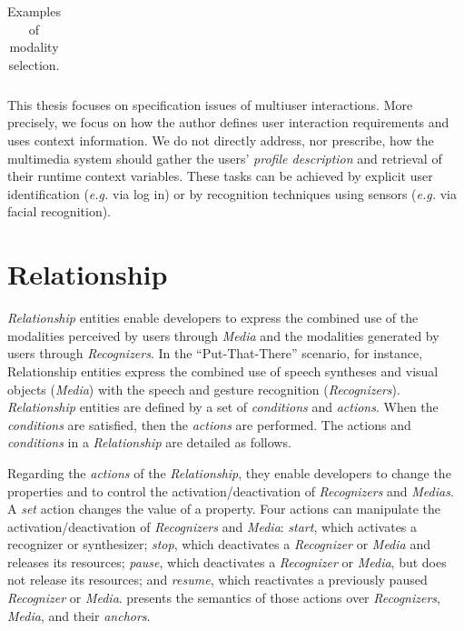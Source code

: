 \begin{table}
\begin{tabular}[!ht]{ c m{5.5cm} m{5.5cm}}
\end{tabular}
\caption{Examples of modality selection.}
\label{table:selection}
\end{table}

This thesis focuses on specification issues of multiuser interactions. More
precisely, we focus on how the author defines user interaction requirements and
uses context information. We do not directly address, nor prescribe, how the
multimedia system should gather the users’ \textit{profile description} and
retrieval of their runtime context variables. These tasks can be achieved by
explicit user identification (\textit{e.g.} via log in) or by recognition techniques using
sensors (\textit{e.g.} via facial recognition).

\section{Relationship}
\label{sec:approuach:relationship}

\textit{Relationship} entities enable developers to express the combined use of
the modalities perceived by users through \textit{Media} and the modalities
generated by users through \textit{Recognizers}. In the “Put-That-There”
scenario, for instance, Relationship entities express the combined use of speech
syntheses and visual objects (\textit{Media}) with the speech and gesture
recognition (\textit{Recognizers}).
\textit{Relationship} entities are defined by a set of \textit{conditions} and
\textit{actions}. When the
\textit{conditions} are satisfied, then the \textit{actions} are performed. The
actions and
\textit{conditions} in a \textit{Relationship} are detailed as follows.

Regarding the \textit{actions} of the \textit{Relationship}, they enable
developers to change the properties and to control the activation/deactivation
of \textit{Recognizers} and \textit{Medias}. A \textit{set} action changes the
value of a property. Four actions can manipulate the activation/deactivation of
\textit{Recognizers} and \textit{Media}: \textit{start}, which activates a
recognizer or synthesizer; \textit{stop}, which deactivates a
\textit{Recognizer} or \textit{Media} and releases its resources;
\textit{pause}, which deactivates a \textit{Recognizer} or \textit{Media}, but
does not release its resources; and \textit{resume}, which reactivates a
previously paused \textit{Recognizer} or \textit{Media}.
 presents the semantics of those actions over
\textit{Recognizers}, \textit{Media}, and their \textit{anchors}.

